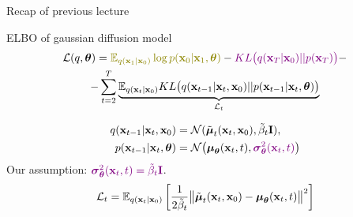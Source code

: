 \begin{frame}{Recap of previous lecture}
	\begin{block}{ELBO of gaussian diffusion model}
		\vspace{-0.7cm}
		\begin{multline*}
			\cL(q, \btheta) =  {\color{olive}\bbE_{q(\bx_1 | \bx_0)} \log p(\bx_0 | \bx_1, \btheta)} - {\color{violet}KL\bigl(q(\bx_T | \bx_0) || p(\bx_T)\bigr)} - \\
			- \sum_{t=2}^T  \underbrace{ \bbE_{q(\bx_t | \bx_0)}KL \bigl(q(\bx_{t-1} | \bx_t, \bx_0) || p(\bx_{t - 1} | \bx_t, \btheta )\bigr)}_{\cL_t}
		\end{multline*}
		\vspace{-1.0cm}
	\end{block}
	\begin{align*}
		q(\mathbf{x}_{t-1} | \mathbf{x}_t, \mathbf{x}_0) &= \mathcal{N}(\tilde{\boldsymbol{\mu}}_t(\mathbf{x}_t, \mathbf{x}_0), \tilde{\beta}_t \mathbf{I}), \\
		p(\mathbf{x}_{t - 1} | \mathbf{x}_t, \boldsymbol{\theta}) &= \mathcal{N} \bigl(\boldsymbol{\mu}_{\boldsymbol{\theta}}(\mathbf{x}_t, t), {\color{violet}\boldsymbol{\sigma}_{\boldsymbol{\theta}}^2(\mathbf{x}_t, t)}\bigr)
	\end{align*}
	Our assumption:	${\color{violet}\boldsymbol{\sigma}_{\boldsymbol{\theta}}^2(\mathbf{x}_t, t) = \tilde{\beta}_t \mathbf{I}}$.
	\[
		\mathcal{L}_t = \mathbb{E}_{q(\mathbf{x}_t | \mathbf{x}_0)} \left[\frac{1}{2\tilde{\beta}_t} \bigl\| \tilde{\boldsymbol{\mu}}_t(\mathbf{x}_t, \mathbf{x}_0) - \boldsymbol{\mu}_{\boldsymbol{\theta}}(\mathbf{x}_t, t) \bigr\|^2  \right]
	\]
\end{frame}
